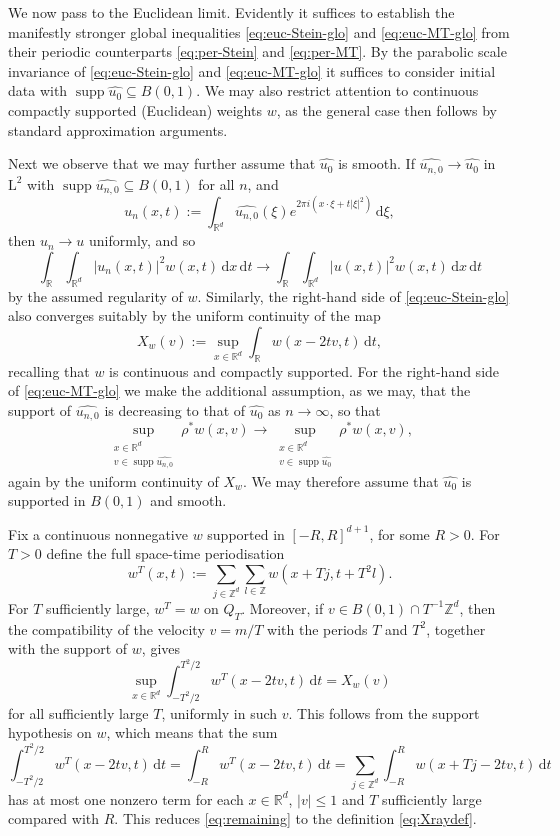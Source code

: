 \documentclass[11pt,reqno]{amsart}
\numberwithin{equation}{section}
\newcommand{\supp}{\operatorname{supp}}
\newcommand{\dd}{\,\mathrm{d}}
\renewcommand{\leq}{\leqslant}
\begin{document}
We now pass to the Euclidean limit. 
Evidently it suffices to establish the manifestly stronger global inequalities \eqref{eq:euc-Stein-glo} and \eqref{eq:euc-MT-glo} from their periodic counterparts \eqref{eq:per-Stein} and \eqref{eq:per-MT}. By the parabolic scale invariance of \eqref{eq:euc-Stein-glo} and \eqref{eq:euc-MT-glo} it suffices to consider initial data with $\supp\widehat{u_0}\subseteq B(0,1)$.
We may also restrict attention to continuous compactly supported (Euclidean) weights $w$, as the general case then follows by standard approximation arguments.

Next we observe that we may further assume that $\widehat{u_0}$ is smooth. If $\widehat{u_{n,0}}\to\widehat{u_0}$ in $\mathrm{L}^2$ with $\supp\widehat{u_{n,0}}\subseteq B(0,1)$ for all $n$, and
\[ u_n(x,t):=\int_{\mathbb{R}^d}\widehat{u_{n,0}}(\xi)e^{2\pi i(x\cdot\xi+t|\xi|^2)}\dd\xi, \]
then $u_n\to u$ uniformly, and so
\[ \int_{\mathbb{R}}\int_{\mathbb{R}^d}|u_n(x,t)|^2w(x,t)\dd x\dd t
\longrightarrow
\int_{\mathbb{R}}\int_{\mathbb{R}^d}|u(x,t)|^2w(x,t)\dd x\dd t \]
by the assumed regularity of $w$.
Similarly, the right-hand side of \eqref{eq:euc-Stein-glo} also converges suitably by the uniform continuity of the map
\begin{equation}\label{eq:Xraydef}
X_w(v):= \sup_{x\in\mathbb{R}^d}\int_{\mathbb{R}}w(x-2tv,t)\dd t,
\end{equation} 
recalling that $w$ is continuous and compactly supported. For the right-hand side of \eqref{eq:euc-MT-glo} we make the additional assumption, as we may, that the support of $\widehat{u_{n,0}}$ is decreasing to that of $\widehat{u_0}$ as $n\rightarrow\infty$, so that
\[ \sup_{\substack{x\in\mathbb{R}^d\\ v\in\supp\widehat{u_{n,0}}}}\!\!\!\!\rho^{\ast}w(x,v)\rightarrow \sup_{\substack{x\in\mathbb{R}^d\\ v\in\supp\widehat{u_0}}}\!\!\!\!\rho^{\ast}w(x,v), \]
again by the uniform continuity of $X_w$.
We may therefore assume that $\widehat{u_0}$ is supported in $B(0,1)$ and smooth.

Fix a continuous nonnegative $w$ supported in $[-R,R]^{d+1}$, for some $R>0$.
For $T>0$ define the full space-time periodisation
\[ w^T(x,t):=\sum_{j\in\mathbb{Z}^d}\sum_{l\in\mathbb{Z}}w(x+Tj,t+T^2l). \]
For $T$ sufficiently large, $w^T=w$ on $Q_T$. Moreover, if $v\in B(0,1)\cap T^{-1}\mathbb{Z}^d$, then the compatibility of the velocity $v=m/T$ with the periods $T$ and $T^2$, together with the support of $w$, gives
\begin{equation}\label{eq:remaining}
\sup_{x\in\mathbb{R}^d} \int_{-T^2/2}^{T^2/2} w^T(x-2tv,t)\dd t=X_w(v)
\end{equation}
for all sufficiently large $T$, uniformly in such $v$.
This follows from the support hypothesis on $w$, which means that the sum
\[ \int_{-T^2/2}^{T^2/2} w^T(x-2tv,t) \dd t=\int_{-R}^{R}w^T(x-2tv,t)\dd t=\sum_{j\in\mathbb{Z}^d}\int_{-R}^{R}w(x+Tj-2tv,t)\dd t \]
has at most one nonzero term for each $x\in\mathbb{R}^d$, $|v|\leq 1$ and $T$ sufficiently large compared with $R$. This reduces \eqref{eq:remaining} to the definition \eqref{eq:Xraydef}.
\end{document}
